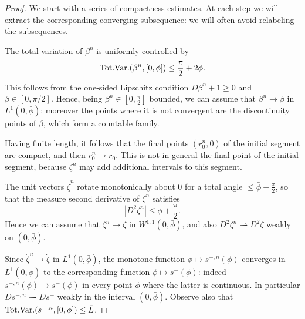 \documentclass[reqno]{amsart}
\newcounter{assu}
\theoremstyle{definition} \newtheorem{definition}{Definition}[section]
\theoremstyle{definition} \newtheorem{remark}[definition]{Remark}
\theoremstyle{plain} \newtheorem{lemma}[definition]{Lemma}
\theoremstyle{plain} \newtheorem{proposition}[definition]{Proposition}
\theoremstyle{plain} \newtheorem{theorem}[definition]{Theorem}
\theoremstyle{plain} \newtheorem{corollary}[definition]{Corollary}
\theoremstyle{definition} \newtheorem{example}[definition]{Example}
\theoremstyle{plain} \newtheorem{claim}[clai]{Claim}
\theoremstyle{definition} \newtheorem{assumption}[definition]{Assumption}
\theoremstyle{definition} \newtheorem{observation}[definition]{Observation}
\newcommand{\TV}{\text{\rm Tot.Var.}}
\newcommand{\1}{\mathbbm 1}
\numberwithin{equation}{section} %
\theoremstyle{plain} \newtheorem*{theorem*}{Theorem}
\theoremstyle{plain} \newtheorem{mthm}[maintheorem]{Main Theorem}
\theoremstyle{plain} \newtheorem*{mthm*}{Main Theorem}
\theoremstyle{plain} \newtheorem*{conjecture*}{Conjecture}
\theoremstyle{plain} \newtheorem{conjecture}[definition]{Conjecture}
\theoremstyle{plain} \newtheorem*{problem*}{Problem}
\begin{document}
\begin{proof}
We start with a series of compactness estimates. At each step we will extract the corresponding converging subsequence: we will often avoid relabeling the subsequences.

\medskip

 The total variation of $\beta^n$ is uniformly controlled by
\begin{equation*}
\TV(\beta^n,[0,{\bar \phi}]) \leq \frac{\pi}{2} + 2 {\bar \phi}.
\end{equation*}
This follows from the one-sided Lipschitz condition $D\beta^n + 1 \geq 0$ and $\beta \in [0,\pi/2]$. Hence, being $\beta^n \in [0,\frac{\pi}{2}]$ bounded, we can assume that $\beta^n \to \beta$ in $L^1(0,{\bar \phi})$: moreover the points where it is not convergent are the discontinuity points of $\beta$, which form a countable family.

\medskip

 Having finite length, it follows that the final points $(r^n_0,0)$ of the initial segment are compact, and then $r^n_0 \to r_0$. This is not in general the final point of the initial segment, because $\zeta^n$ may add additional intervals to this segment.

\medskip

 The unit vectors $\dot \zeta^n$ rotate monotonically about $0$ for a total angle $\leq {\bar \phi} + \frac{\pi}{2}$, so that the measure second derivative of $\zeta^n$ satisfies
\begin{equation*}
|D^2 \zeta^n| \leq {\bar \phi} + \frac{\pi}{2}.
\end{equation*}
Hence we can assume that $\zeta^n \to \zeta$ in $W^{1,1}(0,{\bar \phi})$, and also $D^2 \zeta^n \rightharpoonup D^2 \zeta$ weakly on $(0,{\bar \phi})$. %

\medskip

 Since $\dot \zeta^n \to \dot \zeta$ in $L^1(0,{\bar \phi})$, the monotone function $\phi \mapsto s^{-,n}(\phi)$ converges in $L^1(0,{\bar \phi})$ to the corresponding function $\phi \mapsto s^-(\phi)$: indeed $s^{-,n}(\phi) \to s^-(\phi)$ in every point $\phi$ where the latter is continuous. In particular $D s^{-,n} \rightharpoonup D s^-$ weakly in the interval $(0,{\bar \phi})$. Observe also that $\TV(s^{-,n},[0,{\bar \phi}]) \leq \bar L$.


\end{proof}
\end{document}
